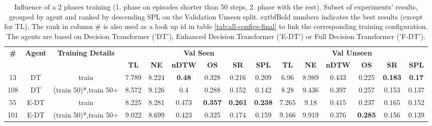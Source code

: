 \begin{table}
\centering
\caption{\label{tab:split_training_50}Influence of a 2 phases training (1. phase on episodes shorter than 50 steps, 2. phase with the rest). Subset of experiments' results, grouped by agent and ranked by descending SPL on the Validation Unseen split. 	extbf{Bold} numbers indicates the best results (except for TL). The rank in column \# is also used as a look up id in table \ref{tab:all-configs-final} to link the corresponding training configuration.     \newline The agents are based on Decision Transformer ('DT'), Enhanced Decision Transformer ('E-DT') or Full Decision Transformer ('F-DT').}
\begin{tabular}{@{\hskip3pt}c@{\hskip3pt}c@{\hskip3pt}c@{\hskip3pt}c@{\hskip3pt}c@{\hskip3pt}c@{\hskip3pt}c@{\hskip3pt}c@{\hskip3pt}c@{\hskip3pt}c@{\hskip3pt}c@{\hskip3pt}c@{\hskip3pt}c@{\hskip3pt}c@{\hskip3pt}c}
\toprule
\textbf{\#} & \textbf{Agent} & \textbf{Training Details} & \multicolumn{6}{c}{\textbf{Val Seen}} & \multicolumn{6}{c}{\textbf{Val Unseen}} \\
 \textbf{~} &     \textbf{~} &                \textbf{~} &       \textbf{TL} &     \textbf{NE} &  \textbf{nDTW} &     \textbf{OS} &     \textbf{SR} &    \textbf{SPL} &         \textbf{TL} &   \textbf{NE} &   \textbf{nDTW} &     \textbf{OS} &     \textbf{SR} &   \textbf{SPL} \\
\midrule
         13 &             DT &                     train &             7.789 &           8.224 &  \textbf{0.48} &           0.328 &           0.216 &           0.209 &                6.96 &         8.989 &           0.433 &           0.225 &  \textbf{0.183} &  \textbf{0.17} \\
        108 &             DT &     (train 50)*,train 50+ &             8.572 &           9.126 &            0.4 &           0.288 &           0.152 &           0.142 &                8.28 &         9.436 &           0.397 &           0.257 &           0.153 &          0.137 \\
         55 &           E-DT &                     train &             8.225 &           8.281 &          0.473 &  \textbf{0.357} &  \textbf{0.261} &  \textbf{0.238} &               7.265 &          9.18 &           0.415 &           0.237 &           0.165 &          0.152 \\
        101 &           E-DT &     (train 50)*,train 50+ &             9.022 &           8.699 &          0.423 &           0.325 &           0.174 &           0.159 &               9.166 &         9.919 &           0.376 &  \textbf{0.285} &           0.156 &          0.139 \\

\end{tabular}
\end{table}
